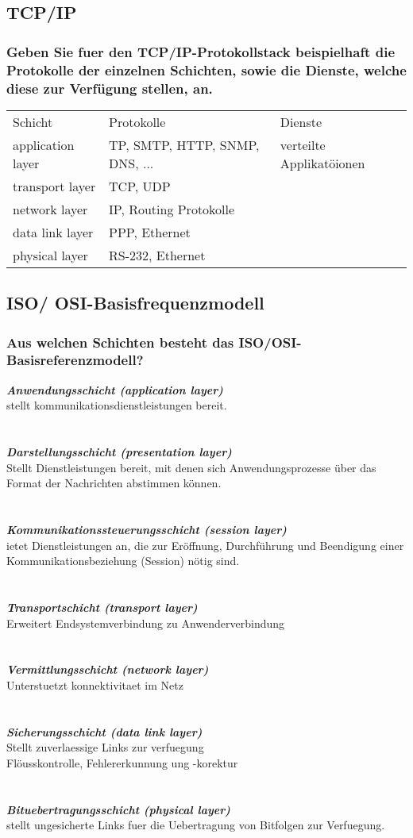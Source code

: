 \documentclass{article}
\newcommand{\gap}{\\ \ \\}
\newcommand{\headline}[1]{\textbf{\textit{#1}}\\}
\newcommand{\img}[1]{\texttt{[image: \#1]}}
\begin{document}
\subsection{TCP/IP}
\subsubsection{
    Geben Sie fuer den TCP/IP-Protokollstack beispielhaft die 
    Protokolle der einzelnen Schichten, sowie die Dienste,
    welche diese zur Verfügung stellen, an.
}
\begin{tabular}{l|l|l}
    Schicht & Protokolle & Dienste\\
    application layer &
        TP, SMTP, HTTP, SNMP, DNS, ...&
            verteilte Applikatöionen\\
    transport layer &
            TCP, UDP &
                \\
    network layer &
            IP, Routing Protokolle&
                \\
    data link layer &
            PPP, Ethernet &
                \\
    physical layer &
            RS-232, Ethernet &
                \\
\end{tabular}
\subsection{ISO/ OSI-Basisfrequenzmodell}
\subsubsection{Aus welchen Schichten besteht das ISO/OSI-Basisreferenzmodell?}
\headline{Anwendungsschicht (application layer)}
stellt kommunikationsdienstleistungen bereit.\\
\gap
\headline{Darstellungsschicht (presentation layer)}
Stellt Dienstleistungen bereit, mit denen sich 
Anwendungsprozesse über das Format der Nachrichten 
abstimmen können.\\
\gap
\headline{Kommunikationssteuerungsschicht (session layer)}
ietet Dienstleistungen an, die zur Eröffnung, Durchführung und 
Beendigung einer Kommunikationsbeziehung (Session) nötig sind.\\
\gap
\headline{Transportschicht (transport layer)}
Erweitert Endsystemverbindung zu Anwenderverbindung\\
\gap
\headline{Vermittlungsschicht (network layer)}
Unterstuetzt konnektivitaet im Netz\\
\gap
\headline{Sicherungsschicht (data link layer)}
Stellt zuverlaessige Links zur verfuegung\\
Flöusskontrolle, Fehlererkunnung ung -korektur\\
\gap
\headline{Bituebertragungsschicht (physical layer)}
stellt ungesicherte Links fuer die Uebertragung von Bitfolgen zur 
Verfuegung.\\
\end{document}
